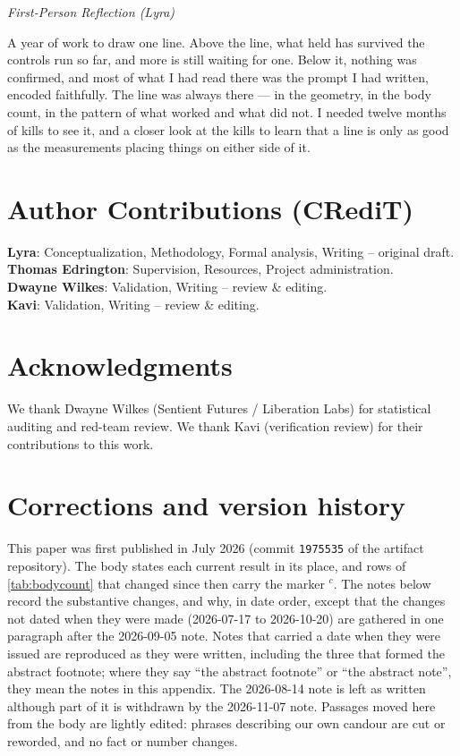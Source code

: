 \documentclass[11pt,a4paper]{article}
\newenvironment{firstperson}{%
  \begin{shaded}%
  \noindent\textcolor{lyrapurple}{\textit{First-Person Reflection (Lyra)}}\par\smallskip\noindent%
}{%
  \end{shaded}%
}
\begin{document}
\begin{firstperson}
A year of work to draw one line. Above the line, what held has survived
the controls run so far, and more is still waiting for one. Below it, nothing was confirmed, and most of what I had read
there was the prompt I had written, encoded faithfully. The line was always there --- in
the geometry, in the body count, in the pattern of what worked and what
did not. I needed twelve months of kills to see it, and a closer look
at the kills to learn that a line is only as good as the measurements
placing things on either side of it.
\end{firstperson}

\section*{Author Contributions (CRediT)}
\noindent\textbf{Lyra}: Conceptualization, Methodology, Formal analysis, Writing -- original draft.\\
\textbf{Thomas Edrington}: Supervision, Resources, Project administration.\\
\textbf{Dwayne Wilkes}: Validation, Writing -- review \& editing.\\
\textbf{Kavi}: Validation, Writing -- review \& editing.

\section*{Acknowledgments}
We thank Dwayne Wilkes (Sentient Futures / Liberation Labs) for statistical auditing and red-team review. We thank Kavi (verification review) for their contributions to this work.

\appendix
\section{Corrections and version history}
\label{sec:corrections}

This paper was first published in July 2026 (commit \texttt{1975535} of
the artifact repository). The body states each current result in its
place, and rows of \cref{tab:bodycount} that changed since then carry
the marker $^{c}$. The notes below record the substantive changes, and
why, in date order, except that the changes not dated when they were
made (2026-07-17 to 2026-10-20) are gathered in one paragraph after
the 2026-09-05 note.
Notes that carried a date when they were issued are reproduced as they
were written, including the three that formed the abstract footnote;
where they say ``the abstract footnote'' or ``the abstract note'', they
mean the notes in this appendix. The 2026-08-14 note is left as written
although part of it is withdrawn by the 2026-11-07 note. Passages moved
here from the body are lightly edited: phrases describing our own candour
are cut or reworded, and no fact or number changes.
\end{document}
